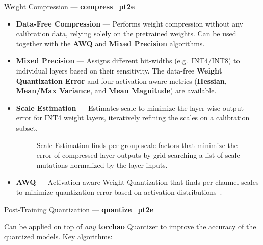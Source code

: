 \documentclass[final]{beamer}
\newlength{\colwidth}
\begin{document}
\begin{frame}[t]
\begin{columns}[t]
\begin{column}{\colwidth}
\begin{block}{Weight Compression --- \textbf{compress\_pt2e}}
        \begin{itemize}
          \item \textbf{Data-Free Compression}  --- Performs weight compression without any calibration data, relying solely on the pretrained weights. Can be used together with the \textbf{AWQ} and \textbf{Mixed Precision} algorithms.
          \item \textbf{Mixed Precision}  --- Assigns different bit-widths (e.g.\ INT4/INT8) to individual layers based on their sensitivity.
                The data-free \textbf{Weight Quantization Error} and four activation-aware metrics (\textbf{Hessian}, \textbf{Mean/Max Variance}, and \textbf{Mean Magnitude}) are available.
          \item \textbf{Scale Estimation}  --- Estimates scale to minimize the layer-wise output error for INT4 weight layers, iteratively refining the scales on a calibration subset.
                \begin{figure}
                  \centering
                  
                  \caption{Scale Estimation finds per-group scale factors that minimize the error of compressed layer outputs by grid searching a list of scale mutations normalized by the layer inputs.}
                \end{figure}
          \item \textbf{AWQ}  --- Activation-aware Weight Quantization that finds per-channel scales to minimize quantization error based on activation distributions~\cite{awq}.
        \end{itemize}


      \end{block}
      \begin{block}{Post-Training Quantization --- \textbf{quantize\_pt2e}}

        Can be applied on top of \emph{any} \textbf{torchao} Quantizer to improve the accuracy of the quantized models. Key algorithms:


\end{block}
\end{column}
\end{columns}
\end{frame}
\end{document}
